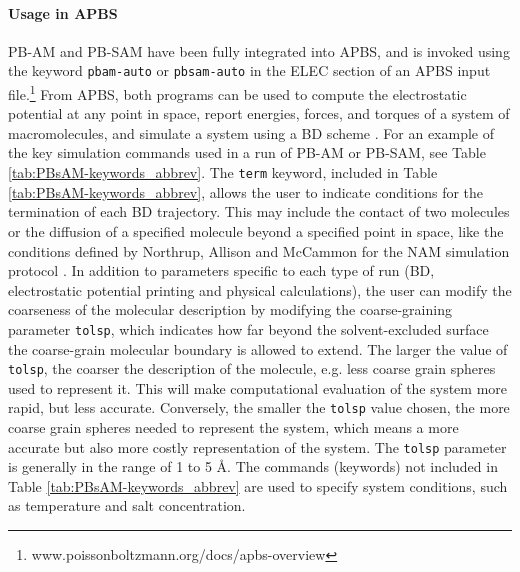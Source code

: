 \documentclass[11pt,titlepage]{article}
\begin{document}
\paragraph{Usage in APBS}
PB-AM and PB-SAM have been fully integrated into APBS, and is invoked using the keyword \texttt{pbam-auto} or \texttt{pbsam-auto} in the ELEC section of an APBS input file.\footnote{www.poissonboltzmann.org/docs/apbs-overview} From APBS, both programs can be used to compute the electrostatic potential at any point in space, report energies, forces, and torques of a system of macromolecules, and simulate a system using a BD scheme \cite{ermak1978}. For an example of the key simulation commands used in a run of PB-AM or PB-SAM, see Table \ref{tab:PBsAM-keywords_abbrev}. The \texttt{term} keyword, included in Table \ref{tab:PBsAM-keywords_abbrev}, allows the user to indicate conditions for the termination of each BD trajectory. This may include the contact of two molecules or the diffusion of a specified molecule beyond a specified point in space, like the conditions defined by Northrup, Allison and McCammon for the NAM simulation protocol \cite{northrup1984}. In addition to parameters specific to each type of run (BD, electrostatic potential printing and physical calculations), the user can modify the coarseness of the molecular description by modifying the coarse-graining parameter \texttt{tolsp}, which indicates how far beyond the solvent-excluded surface the coarse-grain molecular boundary is allowed to extend. The larger the value of \texttt{tolsp}, the coarser the description of the molecule, e.g. less coarse grain spheres used to represent it. This will make computational evaluation of the system more rapid, but less accurate. Conversely, the smaller the \texttt{tolsp} value chosen, the more coarse grain spheres needed to represent the system, which means a more accurate but also more costly representation of the system. The \texttt{tolsp} parameter is generally in the range of 1 to 5 \AA. The commands (keywords) not included in Table \ref{tab:PBsAM-keywords_abbrev} are used to specify system conditions, such as temperature and salt concentration.
\end{document}
